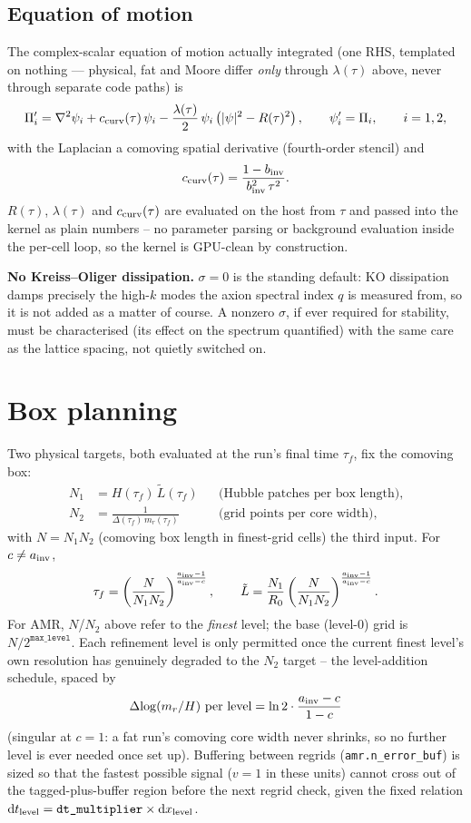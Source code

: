 \documentclass[11pt]{article}
\newcommand{\psivec}{\psi}
\newcommand{\Rt}{\tilde{L}}
\begin{document}
\subsection{Equation of motion}
The complex-scalar equation of motion actually integrated (one RHS, templated on nothing --- physical, fat
and Moore differ \emph{only} through $\lambda(\tau)$ above, never through separate code paths) is
\[
\Pi_i' = \nabla^2\psivec_i + c_{\rm curv}(\tau)\,\psivec_i - \frac{\lambda(\tau)}{2}\,\psivec_i\left(|\psivec|^2 -
R(\tau)^2\right), \qquad \psivec_i' = \Pi_i, \qquad i=1,2,
\]
with the Laplacian a comoving spatial derivative (fourth-order stencil) and
\[
c_{\rm curv}(\tau) = \frac{1-b_{\rm inv}}{b_{\rm inv}^2\,\tau^2}.
\]
$R(\tau)$, $\lambda(\tau)$ and $c_{\rm curv}(\tau)$ are evaluated on the host from $\tau$ and passed into
the kernel as plain numbers -- no parameter parsing or background evaluation inside the per-cell loop, so
the kernel is GPU-clean by construction.

\textbf{No Kreiss--Oliger dissipation.} $\sigma=0$ is the standing default: KO dissipation damps precisely
the high-$k$ modes the axion spectral index $q$ is measured from, so it is not added as a matter of course.
A nonzero $\sigma$, if ever required for stability, must be characterised (its effect on the spectrum
quantified) with the same care as the lattice spacing, not quietly switched on.

\section{Box planning}
\label{sec:boxplan}
Two physical targets, both evaluated at the run's final time $\tau_f$, fix the comoving box:
\begin{align*}
N_1 &= H(\tau_f)\,\Rt(\tau_f) &&\text{(Hubble patches per box length)}, \\
N_2 &= \frac{1}{\Delta(\tau_f)\,m_r(\tau_f)} &&\text{(grid points per core width)},
\end{align*}
with $N=N_1 N_2$ (comoving box length in finest-grid cells) the third input. For $c\neq a_{\rm inv}$,
\[
\tau_f = \left(\frac{N}{N_1 N_2}\right)^{\frac{a_{\rm inv}-1}{a_{\rm inv}-c}}, \qquad
\Rt = \frac{N_1}{R_0}\left(\frac{N}{N_1 N_2}\right)^{\frac{a_{\rm inv}-1}{a_{\rm inv}-c}}.
\]
For AMR, $N$/$N_2$ above refer to the \emph{finest} level; the base (level-0) grid is
$N/2^{\texttt{max\_level}}$. Each refinement level is only permitted once the current finest level's own
resolution has genuinely degraded to the $N_2$ target -- the level-addition schedule, spaced by
\[
\Delta\!\log(m_r/H)\ \text{per level} = \ln 2\cdot\frac{a_{\rm inv}-c}{1-c}
\]
(singular at $c=1$: a fat run's comoving core width never shrinks, so no further level is ever needed once
set up). Buffering between regrids (\texttt{amr.n\_error\_buf}) is sized so that the fastest possible
signal ($v=1$ in these units) cannot cross out of the tagged-plus-buffer region before the next regrid
check, given the fixed relation $\mathrm{d}t_{\rm level} = \texttt{dt\_multiplier}\times \mathrm{d}x_{\rm
level}$.
\end{document}
